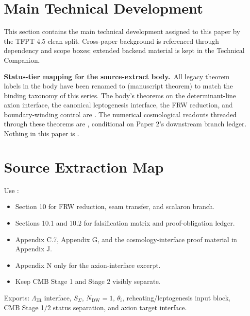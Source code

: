 \documentclass[11pt,a4paper]{article}
\begin{document}
\clearpage
\section{Main Technical Development}

This section contains the main technical development assigned to this paper by the TFPT 4.5 clean split. Cross-paper background is referenced through dependency and scope boxes; extended backend material is kept in the Technical Companion.

\begin{tfptwarningbox}
\textbf{Status-tier mapping for the source-extract body.}\
All legacy  theorem labels in the body have been
renamed to  (manuscript theorem) to match the binding
taxonomy of this series. The body's theorems on the
determinant-line axion interface, the canonical leptogenesis
interface, the FRW reduction, and boundary-winding control
are . The numerical cosmological readouts threaded
through these theorems are , conditional on Paper 2's
\stag{C} downstream branch ledger. Nothing in this paper is
.
\end{tfptwarningbox}

\tfptDraftXrefNotice



\section{Source Extraction Map}

\begin{tfptsourcebox}
Use \sourceDraft:
\begin{itemize}[leftmargin=1.5em]
    \item Section 10 for FRW reduction, seam transfer, and scalaron branch.
    \item Sections 10.1 and 10.2 for falsification matrix and proof-obligation ledger.
    \item Appendix C.7, Appendix G, and the cosmology-interface proof material in Appendix J.
    \item Appendix N only for the axion-interface excerpt.
    \item Keep CMB Stage 1 and Stage 2 visibly separate.
\end{itemize}
\end{tfptsourcebox}


\begin{tfptexports}
Exports: $\Lambda_{\mathrm{IR}}$ interface, $S_\Sigma$, $N_{\mathrm{DW}}=1$, $\theta_i$, reheating/leptogenesis input block, CMB Stage 1/2 status separation, and axion target interface.
\end{tfptexports}
\end{document}
